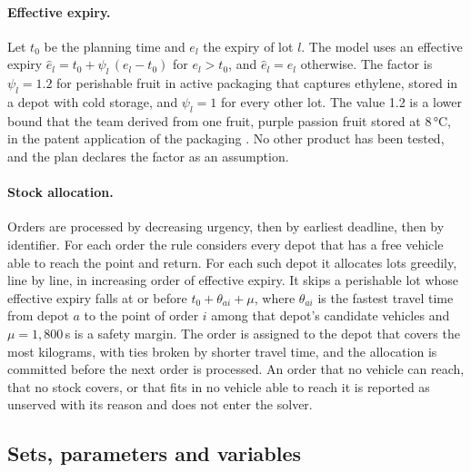 \documentclass[11pt]{article}
\begin{document}
\paragraph{Effective expiry.} Let $t_0$ be the planning time and $e_l$ the expiry of lot $l$. The model uses an effective expiry $\hat e_l = t_0 + \psi_l\,(e_l - t_0)$ for $e_l>t_0$, and $\hat e_l=e_l$ otherwise. The factor is $\psi_l=1.2$ for perishable fruit in active packaging that captures ethylene, stored in a depot with cold storage, and $\psi_l=1$ for every other lot. The value 1.2 is a lower bound that the team derived from one fruit, purple passion fruit stored at 8\,°C, in the patent application of the packaging \citep{PORVERIFICAR_patente37476}. No other product has been tested, and the plan declares the factor as an assumption.

\paragraph{Stock allocation.} Orders are processed by decreasing urgency, then by earliest deadline, then by identifier. For each order the rule considers every depot that has a free vehicle able to reach the point and return. For each such depot it allocates lots greedily, line by line, in increasing order of effective expiry. It skips a perishable lot whose effective expiry falls at or before $t_0+\theta_{ai}+\mu$, where $\theta_{ai}$ is the fastest travel time from depot $a$ to the point of order $i$ among that depot's candidate vehicles and $\mu=1{,}800$\,s is a safety margin. The order is assigned to the depot that covers the most kilograms, with ties broken by shorter travel time, and the allocation is committed before the next order is processed. An order that no vehicle can reach, that no stock covers, or that fits in no vehicle able to reach it is reported as unserved with its reason and does not enter the solver.

\subsection{Sets, parameters and variables}
\end{document}
